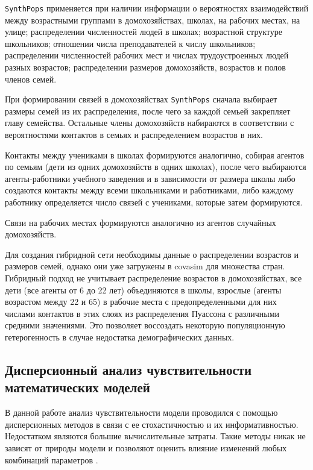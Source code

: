 \documentclass[a4paper,12pt]{article} %
\begin{document}
\texttt{SynthPops} применяется при наличии информации о вероятностях взаимодействий между возрастными группами в домохозяйствах, школах, на рабочих местах, на улице; распределении численностей людей в школах; возрастной структуре школьников; отношении числа преподавателей к числу школьников; распределении численностей рабочих мест и числах трудоустроенных людей разных возрастов; распределении размеров домохозяйств, возрастов и полов членов семей. 

При формировании связей в домохозяйствах \texttt{SynthPops} сначала выбирает размеры семей из их распределения, после чего за каждой семьей закрепляет главу семейства. Остальные члены домохозяйств набираются в соответствии с вероятностями контактов в семьях и распределением возрастов в них.

Контакты между учениками в школах формируются аналогично, собирая агентов по семьям (дети из одних домохозяйств в одних школах), после чего выбираются агенты-работники учебного заведения и в зависимости от размера школы либо создаются контакты между всеми школьниками и работниками, либо каждому работнику определяется число связей с учениками, которые затем формируются.

Связи на рабочих местах формируются аналогично из агентов случайных домохозяйств.

Для создания гибридной сети необходимы данные о распределении возрастов и размеров семей, однако они уже загружены в \gls{covasim} для множества стран. Гибридный подход не учитывает распределение возрастов в домохозяйствах, все дети (все агенты от 6 до 22 лет) объединяются в школы, взрослые (агенты возрастом между 22 и 65) в рабочие места с предопределенными для них числами контактов в этих слоях из распределения Пуассона с различными средними значениями. Это позволяет воссоздать некоторую популяционную гетерогенность в случае недостатка демографических данных.



\subsection{Дисперсионный анализ чувствительности математических моделей}

В данной работе анализ чувствительности модели проводился с помощью дисперсионных методов в связи с ее стохастичностью и их информативностью. Недостатком являются большие вычислительные затраты. Такие методы никак не зависят от природы модели и позволяют оценить влияние изменений любых комбинаций параметров \cite{saltelli2008global}.
\end{document}

